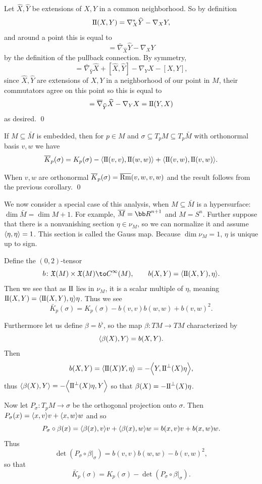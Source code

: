 \elemm

\bproof

    Let $\hat X,\hat Y$ be extensions of $X,Y$ in a common neighborhood.
    So by definition
    $$ {\rm I\mkern-1mu\relax I}(X,Y) = \nabla^*_X\widehat Y - \nabla_XY , $$
    and around a point this is equal to
    $$ = \bar\nabla_{\hat X}\hat Y - \nabla_XY $$
    by the definition of the pullback connection.
    By symmetry,
    $$ = \bar\nabla_{\hat Y}\hat X + [\hat X,\hat Y] - \nabla_YX - [X,Y] , $$
    since $\hat X,\hat Y$ are extensions of $X,Y$ in a neighborhood of our point in $M$, their commutators agree on this point so this is
    equal to
    $$ = \overline\nabla_{\widehat Y}\widehat X - \nabla_YX = {\rm I\mkern-1mu\relax I}(Y,X) $$
    as desired.
    \qed

\eproof

\bcoro

    If $M\subseteq\bar M$ is embedded, then for $p\in M$ and $\sigma\subseteq T_pM\subseteq T_p\bar M$ with orthonormal basis $v,w$
    we have
    $$ \overline K_p(\sigma) = K_p(\sigma) - \mathopen{}\mathclose{\left<{\rm I\mkern-1mu\relax I}(v,v),{\rm I\mkern-1mu\relax I}(w,w)\right>} + \mathopen{}\mathclose{\left<{\rm I\mkern-1mu\relax I}(v,w),{\rm I\mkern-1mu\relax I}(v,w)\right>} . $$

\ecoro

\bproof

    When $v,w$ are orthonormal $\overline K_p(\sigma)=\overline{{\rm Rm}}(v,w,v,w)$ and the result follows from the previous corollary.
    \qed

\eproof

We now consider a special case of this analysis, when $M\subseteq\bar M$ is a hypersurface: $\dim\bar M=\dim M+1$.
For example, $\bar M=\bR^{n+1}$ and $M=S^n$.
Further suppose that there is a nonvanishing section $\eta\in\nu_M$, so we can normalize it and assume $\mathopen{}\mathclose{\left<\eta,\eta\right>}=1$.
This section is called the {\emphcolor Gauss map}.
Because $\dim\nu_M=1$, $\eta$ is unique up to sign.

Define the $(0,2)$-tensor
$$ b\colon\X(M)\times\X(M) \to C^\infty(M),\qquad b(X,Y) = \iprod{\sff(X,Y),\eta} . $$
Then we see that as ${\rm I\mkern-1mu\relax I}$ lies in $\nu_M$, it is a scalar multiple of $\eta$, meaning ${\rm I\mkern-1mu\relax I}(X,Y)=\mathopen{}\mathclose{\left<{\rm I\mkern-1mu\relax I}(X,Y),\eta\right>}\eta$.
Thus we see
$$ \bar K_p(\sigma) = K_p(\sigma) - b(v,v)b(w,w) + b(v,w)^2 . $$

Furthermore let us define $\beta=b^\flat$, so the map $\beta\colon TM\to TM$ characterized by
$$ \mathopen{}\mathclose{\left<\beta(X),Y\right>} = b(X,Y) . $$
Then
$$ b(X,Y) = \mathopen{}\mathclose{\left<{\rm I\mkern-1mu\relax I}(X)Y,\eta\right>} = -\mathopen{}\mathclose{\left<Y,{\rm I\mkern-1mu\relax I}^\perp(X)\eta\right>} , $$
thus $\mathopen{}\mathclose{\left<\beta(X),Y\right>}=-\mathopen{}\mathclose{\left<{\rm I\mkern-1mu\relax I}^\perp(X)\eta,Y\right>}$ so that $\beta(X)=-{\rm I\mkern-1mu\relax I}^\perp(X)\eta$.

Now let $P_\sigma\colon T_pM\to\sigma$ be the orthogonal projection onto $\sigma$.
Then $P_\sigma(x)=\mathopen{}\mathclose{\left<x,v\right>}v+\mathopen{}\mathclose{\left<x,w\right>}w$ and so
$$ P_\sigma\circ\beta(x) = \mathopen{}\mathclose{\left<\beta(x),v\right>}v + \mathopen{}\mathclose{\left<\beta(x),w\right>}w = b(x,v)v + b(x,w)w . $$
Thus
$$ \det(P_\sigma\circ\beta|_\sigma) = b(v,v)b(w,w) - b(v,w)^2 , $$
so that
$$ \bar K_p(\sigma) = K_p(\sigma) - \det(P_\sigma\circ\beta|_\sigma) . $$

